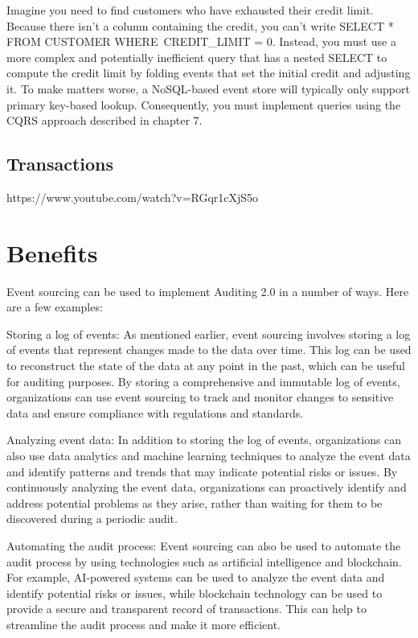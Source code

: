 Imagine you need to find customers who have exhausted their credit limit. Because
there isn’t a column containing the credit, you can’t write SELECT * FROM CUSTOMER
WHERE\ CREDIT\_LIMIT = 0. Instead, you must use a more complex and potentially inefficient query that has a nested SELECT to compute the credit limit by folding events that
set the initial credit and adjusting it. To make matters worse, a NoSQL-based event
store will typically only support primary key-based lookup. Consequently, you must
implement queries using the CQRS approach described in chapter 7.~\citep{richardson2018microservices}

\subsection{Transactions}

https://www.youtube.com/watch?v=RGqr1cXjS5o


\section{Benefits}


Event sourcing can be used to implement Auditing 2.0 in a number of ways. Here are a few examples:

Storing a log of events: As mentioned earlier, event sourcing involves storing a log of events that represent changes made to the data over time. This log can be used to reconstruct the state of the data at any point in the past, which can be useful for auditing purposes. By storing a comprehensive and immutable log of events, organizations can use event sourcing to track and monitor changes to sensitive data and ensure compliance with regulations and standards.

Analyzing event data: In addition to storing the log of events, organizations can also use data analytics and machine learning techniques to analyze the event data and identify patterns and trends that may indicate potential risks or issues. By continuously analyzing the event data, organizations can proactively identify and address potential problems as they arise, rather than waiting for them to be discovered during a periodic audit.

Automating the audit process: Event sourcing can also be used to automate the audit process by using technologies such as artificial intelligence and blockchain. For example, AI-powered systems can be used to analyze the event data and identify potential risks or issues, while blockchain technology can be used to provide a secure and transparent record of transactions. This can help to streamline the audit process and make it more efficient.

